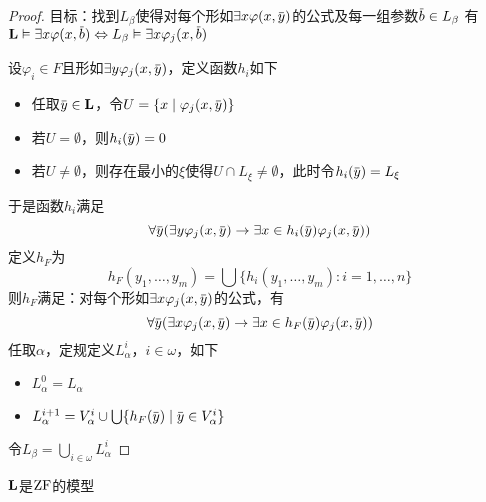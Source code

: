 \documentclass[11pt]{article}
\begin{document}
\begin{proof}
目标：找到\(L_\beta\)使得对每个形如\(\exists x\varphi(x,\bary)\)的公式及每一组参数\(\barb\in L_\beta\)
有\(\bL\vDash\exists x\varphi(x,\barb)\Leftrightarrow L_\beta\vDash\exists x\varphi_j(x,\barb)\)

设\(\varphi_i\in F\)且形如\(\exists y\varphi_j(x,\bary)\)，定义函数\(h_i\)如下
\begin{itemize}
\item 任取\(\bary\in \bL\)，令\(U=\{x\mid\varphi_j(x,\bary)\}\)
\item 若\(U=\emptyset\)，则\(h_i(\bary)=0\)
\item 若\(U\neq\emptyset\)，则存在最小的\(\xi\)使得\(U\cap L_\xi\neq\emptyset\)，此时令\(h_i(\bary)=L_\xi\)
\end{itemize}
于是函数\(h_i\)满足
\begin{equation*}
\forall\bary(\exists y\varphi_j(x,\bary)\to\exists x\in h_i(\bary)\varphi_j(x,\bary))
\end{equation*}
定义\(h_F\)为
\begin{equation*}
h_F(y_1,\dots,y_m)=\bigcup\{h_i(y_1,\dots,y_m):i=1,\dots,n\}
\end{equation*}
则\(h_F\)满足：对每个形如\(\exists x\varphi_j(x,\bary)\)的公式，有
\begin{equation*}
\forall\bary(\exists x\varphi_j(x,\bary)\to\exists x\in h_F(\bary)\varphi_j(x,\bary))
\end{equation*}
任取\(\alpha\)，定规定义\(L_\alpha^i\)，\(i\in\omega\)，如下
\begin{itemize}
\item \(L_\alpha^0=L_\alpha\)
\item \(L_\alpha^{i+1}=V_\alpha^i\cup\bigcup\{h_F(\bary)\mid\bary\in V_\alpha^i\}\)
\end{itemize}
令\(L_\beta=\bigcup_{i\in\omega}L_\alpha^i\)
\end{proof}

\begin{theorem}[ZF]
\(\operatorname{\textbf{L}}\)是\(\operatorname{ZF}\)的模型
\end{theorem}
\end{document}
